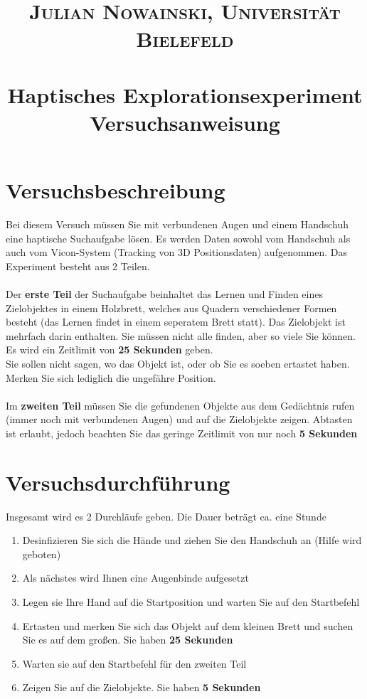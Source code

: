 \documentclass[paper=a4, fontsize=11pt]{scrartcl} %
\title{	
\normalfont \normalsize 
\textsc{Julian Nowainski, Universität Bielefeld} \\ [5pt] %
\horrule{0.5pt} \\[0.4cm] %
\huge Haptisches Explorationsexperiment \\ %
\large Versuchsanweisung
\horrule{2pt} \\[0.5cm] %
\date{\vspace{-10ex}} %
}
\numberwithin{equation}{section} %
\numberwithin{figure}{section} %
\numberwithin{table}{section} %
\begin{document}
\maketitle %


\section{Versuchsbeschreibung}
Bei diesem Versuch müssen Sie mit verbundenen Augen und einem Handschuh eine haptische Suchaufgabe lösen. Es werden Daten sowohl vom Handschuh als auch vom Vicon-System (Tracking von 3D Positionsdaten) aufgenommen. Das Experiment besteht aus 2 Teilen. \\\\
Der \textbf{erste Teil} der Suchaufgabe beinhaltet das Lernen und Finden eines Zielobjektes in einem Holzbrett, welches aus Quadern verschiedener Formen besteht (das Lernen findet in einem seperatem Brett statt). Das Zielobjekt ist mehrfach darin enthalten. Sie müssen nicht alle finden, aber so viele Sie können. Es wird ein Zeitlimit von \textbf{25 Sekunden} geben. \\
Sie sollen nicht sagen, wo das Objekt ist, oder ob Sie es soeben ertastet haben. Merken Sie sich lediglich die ungefähre Position.\\\\
Im \textbf{zweiten Teil} müssen Sie die gefundenen Objekte aus dem Gedächtnis rufen (immer noch mit verbundenen Augen) und auf die Zielobjekte zeigen. Abtasten ist erlaubt, jedoch beachten Sie das geringe Zeitlimit von nur noch \textbf{5 Sekunden}



\section{Versuchsdurchführung}
Insgesamt wird es 2 Durchläufe geben. Die Dauer beträgt ca. eine Stunde

\begin{enumerate}
\item Desinfizieren Sie sich die Hände und ziehen Sie den Handschuh an (Hilfe wird geboten)
\item Als nächstes wird Ihnen eine Augenbinde aufgesetzt
\item Legen sie Ihre Hand auf die Startposition und warten Sie auf den Startbefehl
\item Ertasten und merken Sie sich das Objekt auf dem kleinen Brett und suchen Sie es auf dem großen. Sie haben \textbf{25 Sekunden}
\item Warten sie auf den Startbefehl für den zweiten Teil
\item Zeigen Sie auf die Zielobjekte. Sie haben \textbf{5 Sekunden}
\end{enumerate}



\end{document}
